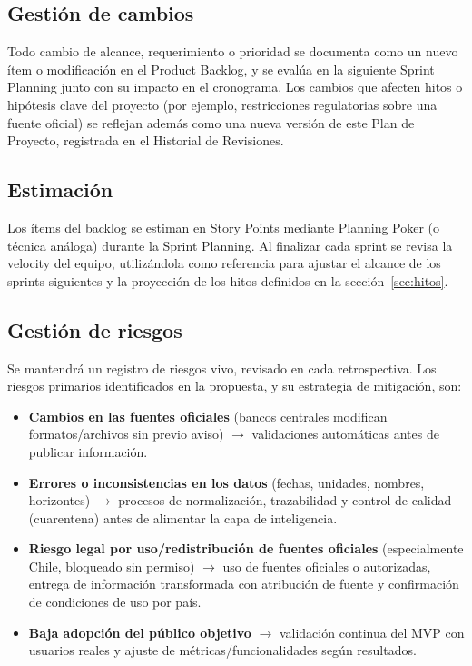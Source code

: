 \documentclass[11pt,a4paper]{article}
\begin{document}
\subsection{Gesti\'on de cambios}

Todo cambio de alcance, requerimiento o prioridad se documenta como un nuevo \'item o modificaci\'on en el Product Backlog, y se eval\'ua en la siguiente Sprint Planning junto con su impacto en el cronograma. Los cambios que afecten hitos o hip\'otesis clave del proyecto (por ejemplo, restricciones regulatorias sobre una fuente oficial) se reflejan adem\'as como una nueva versi\'on de este Plan de Proyecto, registrada en el Historial de Revisiones.

\subsection{Estimaci\'on}

Los \'items del backlog se estiman en Story Points mediante Planning Poker (o t\'ecnica an\'aloga) durante la Sprint Planning. Al finalizar cada sprint se revisa la velocity del equipo, utiliz\'andola como referencia para ajustar el alcance de los sprints siguientes y la proyecci\'on de los hitos definidos en la secci\'on~\ref{sec:hitos}.

\subsection{Gesti\'on de riesgos}

Se mantendr\'a un registro de riesgos vivo, revisado en cada retrospectiva. Los riesgos primarios identificados en la propuesta, y su estrategia de mitigaci\'on, son:

\begin{itemize}
  \item \textbf{Cambios en las fuentes oficiales} (bancos centrales modifican formatos/archivos sin previo aviso) $\rightarrow$ validaciones autom\'aticas antes de publicar informaci\'on.
  \item \textbf{Errores o inconsistencias en los datos} (fechas, unidades, nombres, horizontes) $\rightarrow$ procesos de normalizaci\'on, trazabilidad y control de calidad (cuarentena) antes de alimentar la capa de inteligencia.
  \item \textbf{Riesgo legal por uso/redistribuci\'on de fuentes oficiales} (especialmente Chile, bloqueado sin permiso) $\rightarrow$ uso de fuentes oficiales o autorizadas, entrega de informaci\'on transformada con atribuci\'on de fuente y confirmaci\'on de condiciones de uso por pa\'is.
  \item \textbf{Baja adopci\'on del p\'ublico objetivo} $\rightarrow$ validaci\'on continua del MVP con usuarios reales y ajuste de m\'etricas/funcionalidades seg\'un resultados.
\end{itemize}
\end{document}

